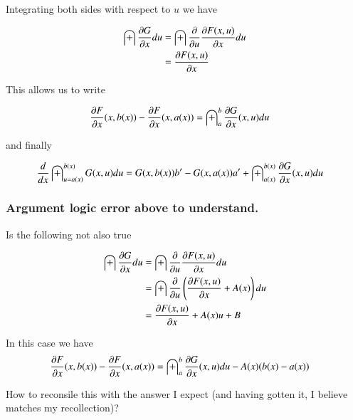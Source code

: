 \documentclass{article}
\begin{document}
Integrating both sides with respect to $u$ we have

\begin{align*}
\int \PD{x}{G} du 
&= \int \PD{u}{} \PD{x}{F(x,u)} du \\
&= \PD{x}{F(x,u)} 
\end{align*}

This allows us to write 

\begin{align*}
\PD{x}{F}(x,b(x))
-\PD{x}{F}(x,a(x))
&=
\int_{a}^b \PD{x}{G}(x,u) du
\end{align*}

and finally

\begin{align}\label{eqn:diffInt}
\frac{d}{dx} \int_{u = a(x)}^{b(x)} G(x,u) du
&=
G(x,b(x)) b'
-G(x,a(x)) a'
+ \int_{a(x)}^{b(x)} \PD{x}{G}(x,u) du
\end{align}

\subsubsection{ Argument logic error above to understand. }

Is the following not also true

\begin{align*}
\int \PD{x}{G} du 
&= \int \PD{u}{} \PD{x}{F(x,u)} du \\
&= \int \PD{u}{} \left( \PD{x}{F(x,u)} + A(x) \right) du \\
&= \PD{x}{F(x,u)} + A(x)u + B
\end{align*}

In this case we have
\begin{align*}
\PD{x}{F}(x,b(x)) -\PD{x}{F}(x,a(x)) &= \int_{a}^b \PD{x}{G}(x,u) du - A(x) ( b(x) - a(x))
\end{align*}

How to reconsile this with the answer I expect (and having gotten it, I believe matches my recollection)?



\end{document}
